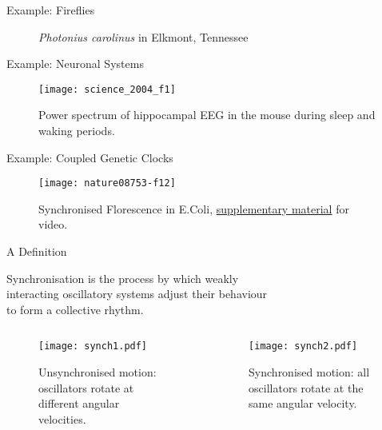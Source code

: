 \documentclass[10pt,reqno]{beamer}
\begin{document}
\begin{frame}{Example: Fireflies\cite{Yiu2017}}
\begin{figure}
\caption{\emph{Photonius carolinus} in Elkmont, Tennessee}
\end{figure}
\end{frame}
\begin{frame}{Example: Neuronal Systems\cite{Buzsaki:2004aa}}
\begin{figure}
\texttt{[image: science\_2004\_f1]}
\caption{Power spectrum of hippocampal EEG in the mouse during sleep and waking periods.}
\end{figure}
\end{frame}
\begin{frame}{Example: Coupled Genetic Clocks\cite{Danino:2010aa}}
\begin{figure}
\texttt{[image: nature08753-f12]}
\caption{Synchronised Florescence in E.Coli, \href{https://www.nature.com/articles/nature08753}{supplementary material} for video.}
\end{figure}
\end{frame}
\begin{frame}{A Definition}

\begin{tcolorbox}[notitle, boxrule=0pt, colback=lred]
\centering
	Synchronisation is the process by which weakly\\ interacting oscillatory systems adjust their behaviour\\ to form a collective rhythm.
\end{tcolorbox}
	\begin{columns}
		\scriptsize
	\begin{column}{0.49\textwidth}
		\begin{figure}
			\texttt{[image: synch1.pdf]}
			\caption{Unsynchronised motion: oscillators rotate at different angular velocities.}
		\end{figure}
	\end{column}
	\begin{column}{0.49\textwidth}
		\begin{figure}
			\texttt{[image: synch2.pdf]}
			\caption{Synchronised motion: all oscillators rotate at the same angular velocity.}
		\end{figure}
	\end{column}
\end{columns}
\end{frame}
\end{document}
